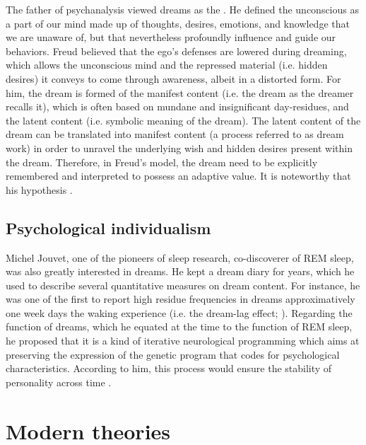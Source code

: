 The father of psychanalysis viewed dreams as the  \citep{freud_interpretation_1900}. He defined the unconscious as a part of our mind made up of thoughts, desires, emotions, and knowledge that we are unaware of, but that nevertheless profoundly influence and guide our behaviors. Freud believed that the ego’s defenses are lowered during dreaming, which allows the unconscious mind and the repressed material (i.e. hidden desires) it conveys to come through awareness, albeit in a distorted form. For him, the dream is formed of the manifest content (i.e. the dream as the dreamer recalls it), which is often based on mundane and insignificant day-residues, and the latent content (i.e. symbolic meaning of the dream). The latent content of the dream can be translated into manifest content (a process referred to as dream work) in order to unravel the underlying wish and hidden desires present within the dream. Therefore, in Freud’s model, the dream need to be explicitly remembered and interpreted to possess an adaptive value. It is noteworthy that his hypothesis  \citep{ruby_experimental_2011}.

\subsection{Psychological individualism}
\label{sec:dream-func:history:jouvet}

Michel Jouvet, one of the pioneers of sleep research, co-discoverer of REM sleep, was also greatly interested in dreams. He kept a dream diary for years, which he used to describe several quantitative measures on dream content. For instance, he was one of the first to report high residue frequencies in dreams approximatively one week days the waking experience (i.e. the dream-lag effect; \citealp{jouvet_memoire_1979}). Regarding the function of dreams, which he equated at the time to the function of REM sleep, he proposed that it is a kind of iterative neurological programming which aims at preserving the expression of the genetic program that codes for psychological characteristics. According to him, this process would ensure the stability of personality across time \citep{jouvet_sommeil_1991}.

\section{Modern theories}
\label{sec:dream-func:modern}

